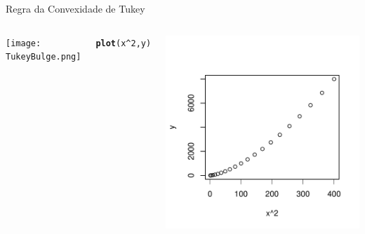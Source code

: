 \documentclass{beamer}\usepackage[]{graphicx}\usepackage[]{color}
\makeatletter
\newcommand{\hlnum}[1]{\textcolor[rgb]{0.686,0.059,0.569}{#1}}%
\newcommand{\hlopt}[1]{\textcolor[rgb]{0,0,0}{#1}}%
\newcommand{\hlstd}[1]{\textcolor[rgb]{0.345,0.345,0.345}{#1}}%
\newcommand{\hlkwd}[1]{\textcolor[rgb]{0.737,0.353,0.396}{\textbf{#1}}}%
\newenvironment{kframe}{%
 \def\at@end@of@kframe{}%
 \ifinner\ifhmode%
  \def\at@end@of@kframe{\end{minipage}}%
  \begin{minipage}{\columnwidth}%
 \fi\fi%
 \def\FrameCommand##1{\hskip\@totalleftmargin \hskip-\fboxsep
 \colorbox{shadecolor}{##1}\hskip-\fboxsep
     \hskip-\linewidth \hskip-\@totalleftmargin \hskip\columnwidth}%
 \MakeFramed {\advance\hsize-\width
   \@totalleftmargin\z@ \linewidth\hsize
   \@setminipage}}%
 {\par\unskip\endMakeFramed%
 \at@end@of@kframe}
\newenvironment{knitrout}{}{} %
\renewenvironment{knitrout}{\setlength{\topsep}{0mm}}{}
\makeatother
\begin{document}
\begin{frame}{Regra da Convexidade de Tukey}

\begin{columns}[c]

\centering
\texttt{[image: TukeyBulge.png]}

\centering
\begin{knitrout}\scriptsize
{}\color{fgcolor}\begin{kframe}
\begin{alltt}
\hlkwd{plot}\hlstd{(x}\hlopt{^}\hlnum{2}\hlstd{,y)}
\end{alltt}
\end{kframe}
\includegraphics[width=0.7\linewidth]{figure/rem4-1} 

\end{knitrout}

\end{columns}

\end{frame}
\end{document}
